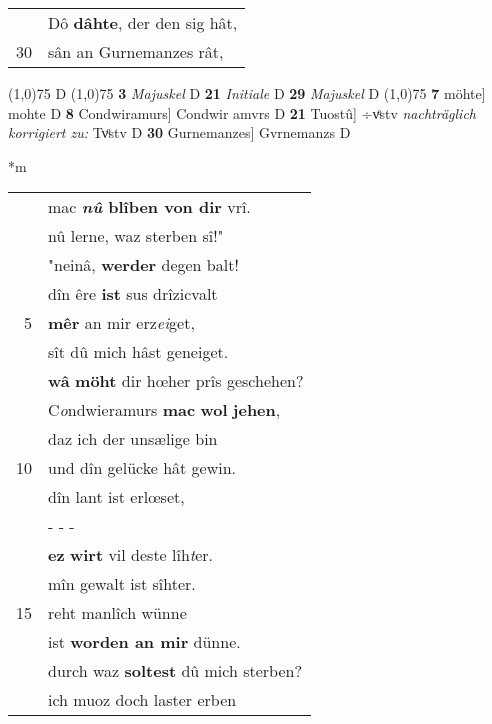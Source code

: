 \documentclass[8pt,a4paper,notitlepage]{article}
\begin{document}
\begin{table}[ht]
\begin{minipage}[t]{0.5\linewidth}
\begin{tabular}{rl}
 & Dô \textbf{dâhte}, der den sig hât,\\ 
30 & sân an Gurnemanzes rât,\\ 
\end{tabular}
\scriptsize
\line(1,0){75} \newline
D \newline
\line(1,0){75} \newline
\textbf{3} \textit{Majuskel} D  \textbf{21} \textit{Initiale} D  \textbf{29} \textit{Majuskel} D  \newline
\line(1,0){75} \newline
\textbf{7} möhte] mohte D \textbf{8} Condwiramurs] Condwir amvrs D \textbf{21} Tuostû] ÷vͦstv \textit{nachträglich korrigiert zu:} Tvͦstv D \textbf{30} Gurnemanzes] Gvrnemanzs D \newline
\end{minipage}
\hspace{0.5cm}
\begin{minipage}[t]{0.5\linewidth}
\small
\begin{center}*m
\end{center}
\begin{tabular}{rl}
 & mac \textbf{\textit{nû} blîben von dir} vrî.\\ 
 & nû lerne, waz sterben sî!"\\ 
 & "neinâ, \textbf{werder} degen balt!\\ 
 & dîn êre \textbf{ist} sus drîzicvalt\\ 
5 & \textbf{mêr} an mir erz\textit{ei}get,\\ 
 & sît dû mich hâst geneiget.\\ 
 & \textbf{wâ} \textbf{möht} dir hœher prîs geschehen?\\ 
 & C\textit{o}ndwieramurs \textbf{mac} \textbf{wol} \textbf{jehen},\\ 
 & daz ich der unsælige bin\\ 
10 & und dîn gelücke hât gewin.\\ 
 & dîn lant ist erlœset,\\ 
 & \multicolumn{1}{l}{ - - - }\\ 
 & \textbf{ez} \textbf{wirt} vil deste lîh\textit{t}er.\\ 
 & mîn gewalt ist sîhter.\\ 
15 & reht manlîch wünne\\ 
 & ist \textbf{worden an mir} dünne.\\ 
 & durch waz \textbf{soltest} dû mich sterben?\\ 
 & ich muoz doch laster erben\\ 

\end{tabular}
\end{minipage}
\end{table}
\end{document}
